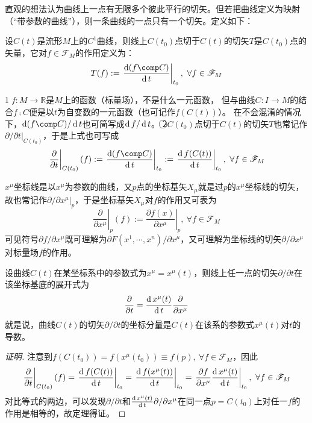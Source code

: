 直观的想法认为曲线上一点有无限多个彼此平行的切矢。但若把曲线定义为映射（``带参数的曲线''），则一条曲线的一点只有一个切矢。定义如下：

\begin{definition}
设$C(t)$是流形$M$上的$C^1$曲线，则线上$C(t_0)$点切于$C(t)$的切矢$T$是$C(t_0)$点的矢量，它对$f \in \mathscr{F}_M$的作用定义为：
$$T(f) := \left.\frac{\diff (f \comp C)}{\diff t}\right|_{t_0}, ~ \forall f \in \mathscr{F}_M$$
\end{definition}

\begin{note}
\textcircled{1}$f \colon M \to \mathbb{R}$是$M$上的函数（标量场），不是什么一元函数，
但与曲线$C \colon I \to M$的结合$f \comp C$便是以$t$为自变数的一元函数（也可记作$f(C(t))$）。
在不会混淆的情况下，$\diff (f \comp C) / \diff t$也可简写成$\operatorname{d} f / \operatorname{d} t$。
\textcircled{2}$C(t_0)$点切于$C(t)$的切矢$T$也常记作$\partial / \partial t|_{C(t_0)}$，于是上式也可写成
$$\left.\frac{\partial}{\partial t}\right|_{C(t_0)}(f) := \left.\frac{\diff (f \comp C)}{\diff t}\right|_{t_0} := \left.\frac{\diff f(C(t))}{\diff t}\right|_{t_0}, ~ \forall f \in \mathscr{F}_M$$
\end{note}

\begin{example}
$x^\mu$坐标线是以$x^\mu$为参数的曲线，又$p$点的坐标基矢$X_\mu$就是过$p$的$x^\mu$坐标线的切矢，故也常记作$\partial / \partial x^\mu|_p$，于是坐标基矢$X_\mu$对$f$的作用又可表为
$$\left.\frac{\partial}{\partial x^\mu}\right|_p(f) := \left.\frac{\partial f(x)}{\partial x^\mu}\right|_p, ~ \forall f \in \mathscr{F}_M$$
可见符号$\partial f / \partial x^\mu$既可理解为$\partial F(x^1, \cdots, x^n) / \partial x^\mu$，又可理解为坐标线的切矢$\partial / \partial x^\mu$对标量场$f$的作用。
\end{example}

\begin{theorem}
设曲线$C(t)$在某坐标系中的参数式为$x^\mu = x^\mu(t)$，则线上任一点的切矢$\partial / \partial t$在该坐标基底的展开式为
$$\frac{\partial}{\partial t} = \frac{\operatorname{d} x^\mu(t)}{\operatorname{d} t}\frac{\partial}{\partial x^\mu}$$
就是说，曲线$C(t)$的切矢$\partial / \partial t$的坐标分量是$C(t)$在该系的参数式$x^\mu(t)$对$t$的导数。
\end{theorem}

\begin{proof}[证明]
注意到$f(C(t_0)) = f(x^\mu(t_0)) \equiv f(p), ~ \forall f \in \mathscr{F}_M$，因此
$$\left.\frac{\partial}{\partial t}\right|_{C(t_0)}(f) = \left.\frac{\operatorname{d} f(C(t))}{\operatorname{d} t}\right|_{t_0}
= \left.\frac{\operatorname{d} f(x^\mu(t))}{\operatorname{d} t}\right|_{t_0} = \left.\frac{\partial f}{\partial x^\mu}\frac{\operatorname{d} x^\mu(t)}{\operatorname{d} t}\right|_{t_0}, ~ \forall f \in \mathscr{F}_M$$
对比等式的两边，可以发现$\partial / \partial t$和$\frac{\operatorname{d} x^\mu(t)}{\operatorname{d} t}\partial / \partial x^\mu$在同一点$p = C(t_0)$上对任一$f$的作用是相等的，故定理得证。
\end{proof}


